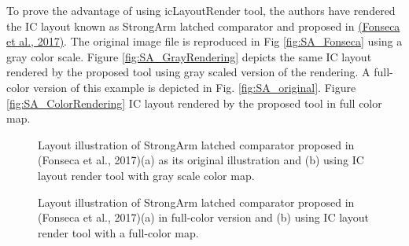 \documentclass[10pt,a4paper,onecolumn]{article}
\begin{document}
To prove the advantage of using icLayoutRender tool, the authors have
rendered the IC layout known as StrongArm latched comparator and proposed in \hyperlink{ref-Fonseca2017}{(Fonseca et al., 2017)}. 
The original image file is reproduced in Fig \ref{fig:SA_Fonseca} using a gray color scale. Figure \ref{fig:SA_GrayRendering} depicts the
same IC layout rendered by the proposed tool using gray scaled version
of the rendering. A full-color version of this example is depicted in
Fig. \ref{fig:SA_original}. Figure \ref{fig:SA_ColorRendering} IC layout rendered by the proposed tool in full
color map.

\begin{figure}[ht]
 \begin{center}
   \caption{Layout illustration of StrongArm latched comparator proposed in 
   (Fonseca et al., 2017)(a) as its original illustration and (b) using IC layout render tool with gray scale color map.}
 \end{center}
\end{figure}

\begin{figure}[ht]
 \begin{center}
   \caption{Layout illustration of StrongArm latched comparator proposed in
(Fonseca et al., 2017)(a) in full-color version and (b) using IC
layout render tool with a full-color map.}
 \end{center}
\end{figure}
\end{document}
